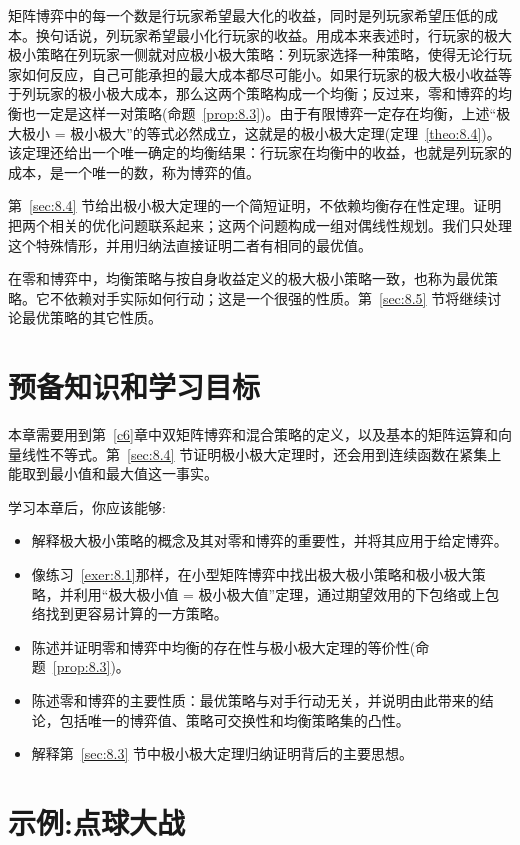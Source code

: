 矩阵博弈中的每一个数是行玩家希望最大化的收益，同时是列玩家希望压低的成本。换句话说，列玩家希望最小化行玩家的收益。用成本来表述时，行玩家的极大极小策略在列玩家一侧就对应极小极大策略：列玩家选择一种策略，使得无论行玩家如何反应，自己可能承担的最大成本都尽可能小。如果行玩家的极大极小收益等于列玩家的极小极大成本，那么这两个策略构成一个均衡；反过来，零和博弈的均衡也一定是这样一对策略(命题~\ref{prop:8.3})。由于有限博弈一定存在均衡，上述“极大极小 = 极小极大”的等式必然成立，这就是\citet{vonneumann1928}的极小极大定理(定理~\ref{theo:8.4})。该定理还给出一个唯一确定的均衡结果：行玩家在均衡中的收益，也就是列玩家的成本，是一个唯一的数，称为博弈的值。

第~\ref{sec:8.4} 节给出极小极大定理的一个简短证明，不依赖均衡存在性定理。证明把两个相关的优化问题联系起来；这两个问题构成一组对偶线性规划。我们只处理这个特殊情形，并用归纳法直接证明二者有相同的最优值。

在零和博弈中，均衡策略与按自身收益定义的极大极小策略一致，也称为最优策略。它不依赖对手实际如何行动；这是一个很强的性质。第~\ref{sec:8.5} 节将继续讨论最优策略的其它性质。

\section{ 预备知识和学习目标}\label{sec:8.1}
本章需要用到第~\ref{c6}章中双矩阵博弈和混合策略的定义，以及基本的矩阵运算和向量线性不等式。第~\ref{sec:8.4} 节证明极小极大定理时，还会用到连续函数在紧集上能取到最小值和最大值这一事实。

学习本章后，你应该能够:
\begin{itemize}
\item 解释极大极小策略的概念及其对零和博弈的重要性，并将其应用于给定博弈。
\item 像练习~\ref{exer:8.1}那样，在小型矩阵博弈中找出极大极小策略和极小极大策略，并利用“极大极小值 = 极小极大值”定理，通过期望效用的下包络或上包络找到更容易计算的一方策略。
\item 陈述并证明零和博弈中均衡的存在性与极小极大定理的等价性(命题~\ref{prop:8.3})。
\item 陈述零和博弈的主要性质：最优策略与对手行动无关，并说明由此带来的结论，包括唯一的博弈值、策略可交换性和均衡策略集的凸性。
\item 解释第~\ref{sec:8.3} 节中极小极大定理归纳证明背后的主要思想。
\end{itemize}

\section{示例:点球大战}\label{sec:8.2}

